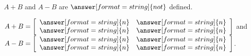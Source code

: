 \documentclass{ximera}
\begin{document}
\begin{problem}
\begin{enumerate}
    $A+B$ and $A-B$ are $\answer[format=string]{not}$ defined.

    $A + B = \startmat{rr}
      \answer[format=string]{n} & \answer[format=string]{n} \\
      \answer[format=string]{n} & \answer[format=string]{n}
    \stopmat$
    and $A - B = \startmat{rr}
      \answer[format=string]{n} & \answer[format=string]{n} \\
      \answer[format=string]{n} & \answer[format=string]{n}
    \stopmat$.

  \end{enumerate}

\end{problem}
\end{document}
